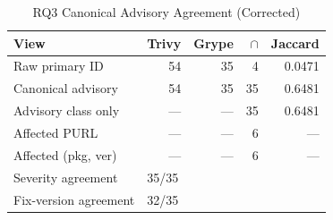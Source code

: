 \begin{table}[htbp]
\caption{RQ3 Canonical Advisory Agreement (Corrected)}
\label{tab:rq3-canonical}
\centering\small
\begin{tabular}{lrrrr}
\toprule
\textbf{View} & \textbf{Trivy} & \textbf{Grype} & \textbf{$\cap$} & \textbf{Jaccard} \\
\midrule
  Raw primary ID & 54 & 35 & 4 & 0.0471 \\
  Canonical advisory & 54 & 35 & 35 & 0.6481 \\
  Advisory class only & --- & --- & 35 & 0.6481 \\
  Affected PURL & --- & --- & 6 & --- \\
  Affected (pkg, ver) & --- & --- & 6 & --- \\
\midrule
  Severity agreement & \multicolumn{4}{l}{35/35} \\
  Fix-version agreement & \multicolumn{4}{l}{32/35} \\
\bottomrule
\end{tabular}
\end{table}
